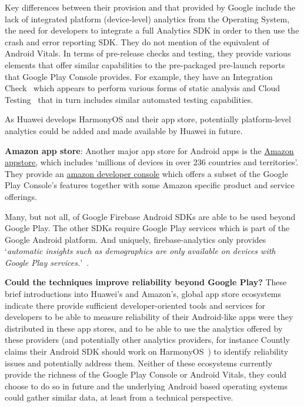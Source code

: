 Key differences between their provision and that provided by Google include the lack of integrated platform (device-level) analytics from the Operating System, the need for developers to integrate a full Analytics SDK in order to then use the crash and error reporting SDK. They do not mention of the equivalent of Android Vitals. In terms of pre-release checks and testing, they provide various elements that offer similar capabilities to the pre-packaged pre-launch reports that Google Play Console provides. For example, they have an Integration Check~\citep{huawei_appgallery_integration_check} which appears to perform various forms of static analysis and Cloud Testing~\citep{huawei_appgallery_cloud_testing} that in turn includes similar automated testing capabilities. 

As Huawei develops HarmonyOS and their app store, potentially platform-level analytics could be added and made available by Huawei in future.

\textbf{Amazon app store}: 
Another major app store for Android apps is the \href{https://developer.amazon.com/apps-and-games}{Amazon appstore}, which includes `millions of devices in over 236 countries and territories'. They provide an \href{https://developer.amazon.com/settings/console/home}{amazon developer console} which offers a subset of the Google Play Console's features together with some Amazon specific product and service offerings. 

Many, but not all, of Google Firebase Android SDKs are able to be used beyond Google Play. The other SDKs require Google Play services which is part of the Google Android platform. And uniquely, firebase-analytics only provides `\emph{automatic insights such as demographics are only available on devices with Google Play services.}'~\citep{firebasesupport2020_dependencies_of_firebase_sdks_on_google_play_services}. 


\textbf{Could the techniques improve reliability beyond Google Play?} 
These brief introductions into Huawei's and Amazon's, global app store ecosystems indicate there provide sufficient developer-oriented tools and services for developers to be able to measure reliability of their Android-like apps were they distributed in these app stores, and to be able to use the analytics offered by these providers (and potentially other analytics providers, for instance Countly claims their Android SDK should work on HarmonyOS~\citep{countly_which_operating_systems_are_supported}) to identify reliability issues and potentially address them. Neither of these ecosystems currently provide the richness of the Google Play Console or Android Vitals, they could choose to do so in future and the underlying Android based operating systems could gather similar data, at least from a technical perspective.

